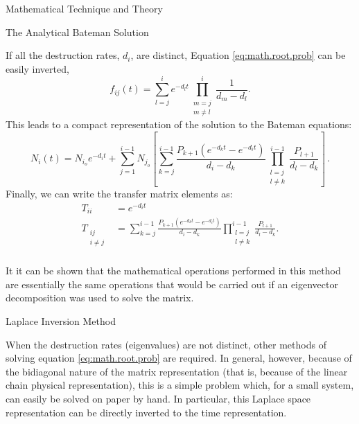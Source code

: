 \begin{chapter}{Mathematical Technique and Theory}
\begin{section}{The Analytical Bateman Solution}\label{sec:math.bateman}
  
  If all the destruction rates, $d_i$, are distinct, Equation
  \ref{eq:math.root.prob} can be easily inverted,
  \begin{equation}
    f_{ij}(t) = \sum_{l=j}^{i} e^{-d_l t} 
    \prod_{\substack{
        m=j \\
        m\neq l
        }}^i
    \frac{1}{d_m - d_l}\label{eqn:math.bateman.inversion}.
  \end{equation}
  This leads to a compact representation of the solution to the
  Bateman equations:
  \begin{equation}
    N_i(t) = N_{i_o}e^{-d_i t} + \sum_{j=1}^{i-1}N_{j_o}\left [
      \sum_{k=j}^{i-1}\frac{P_{k+1}(e^{-d_k t} - e^{-d_i t})}{d_i -
        d_k}\prod_{\substack{l=j\\l\neq k}}^{i-1}\frac{P_{l+1}}{d_l-d_k}\right] \, .
  \end{equation}
  Finally, we can write the transfer matrix elements as:
  \begin{equation}
    \begin{split}
      T_{ii} &= e^{-d_i t}\\
      T_{\substack{ij\\i\neq j}} &= \sum_{k=j}^{i-1}\frac{P_{k+1}(e^{-d_k t} - e^{-d_i t})}{d_i -
        d_k}\prod_{\substack{l=j\\l\neq k}}^{i-1}\frac{P_{l+1}}{d_l-d_k}.\label{eqn:math.bateman.final}\\
    \end{split}
  \end{equation}
  
  It it can be shown that the mathematical operations performed in
  this method are essentially the same operations that would be
  carried out if an eigenvector decomposition was used to solve the
  matrix.

\end{section}

\begin{section}{Laplace Inversion Method}\label{sec:math.inversion}
  
  When the destruction rates (eigenvalues) are not distinct, other
  methods of solving equation \ref{eq:math.root.prob} are required.
  In general, however, because of the bidiagonal nature of the matrix
  representation (that is, because of the linear chain physical
  representation), this is a simple problem which, for a small system,
  can easily be solved on paper by hand.  In particular, this Laplace
  space representation can be directly inverted to the time
  representation.
  

\end{section}
\end{chapter}
